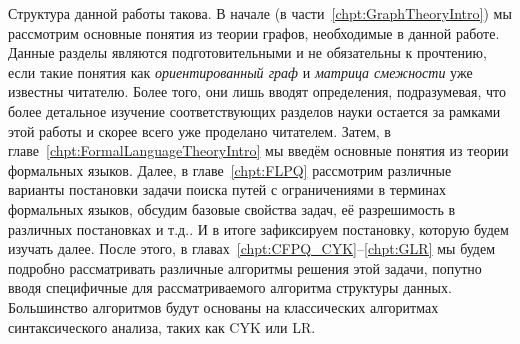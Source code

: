 Структура данной работы такова.
В начале (в части~\ref{chpt:GraphTheoryIntro}) мы рассмотрим основные понятия из теории графов, необходимые в данной работе. Данные разделы являются подготовительными и не обязательны к прочтению, если такие понятия как \textit{ориентированный граф} и \textit{матрица смежности} уже известны читателю. Более того, они лишь вводят определения, подразумевая, что более детальное изучение соответствующих разделов науки остается за рамками этой работы и скорее всего уже проделано читателем.
Затем, в главе~\ref{chpt:FormalLanguageTheoryIntro} мы введём основные понятия из теории формальных языков.
Далее, в главе~\ref{chpt:FLPQ} рассмотрим различные варианты постановки задачи поиска путей с ограничениями в терминах формальных языков, обсудим базовые свойства задач, её разрешимость в различных постановках и т.д..
И в итоге зафиксируем постановку, которую будем изучать далее.
После этого, в главах~\ref{chpt:CFPQ_CYK}--\ref{chpt:GLR} мы будем подробно рассматривать различные алгоритмы решения этой задачи, попутно вводя специфичные для рассматриваемого алгоритма структуры данных.
Большинство алгоритмов будут основаны на классических алгоритмах синтаксического анализа, таких как CYK или LR.

\begin{center}
\end{center}